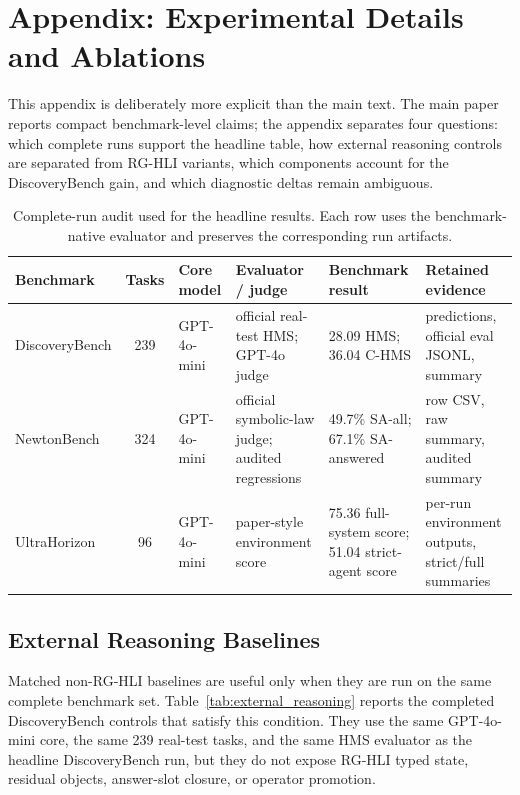 \documentclass[letterpaper]{article}
\newcommand{\tblhdr}{\rowcolor{headerrow}}
\newcommand{\methodshort}{\textsc{RG-HLI}\xspace}
\newcommand{\gptmini}{GPT-4o-mini\xspace}
\newcommand{\gptfour}{GPT-4o\xspace}
\begin{document}


\clearpage
\onecolumn
\section*{Appendix: Experimental Details and Ablations}

This appendix is deliberately more explicit than the main text. The main paper
reports compact benchmark-level claims; the appendix separates four questions:
which complete runs support the headline table, how external reasoning controls
are separated from \methodshort variants, which components account for the
DiscoveryBench gain, and which diagnostic deltas remain ambiguous.

\begin{table}[H]
\centering
\caption{Complete-run audit used for the headline results. Each row uses the
benchmark-native evaluator and preserves the corresponding run artifacts.}
\label{tab:appendix_fullrun_audit}
\small
\setlength{\tabcolsep}{5pt}
\begin{tabularx}{0.96\textwidth}{@{}lclYYY@{}}
\toprule
\tblhdr
Benchmark & Tasks & Core model & Evaluator / judge & Benchmark result & Retained evidence \\
\midrule
DiscoveryBench & 239 & \gptmini & official real-test HMS; \gptfour judge & 28.09 HMS; 36.04 C-HMS & predictions, official eval JSONL, summary \\
NewtonBench & 324 & \gptmini & official symbolic-law judge; audited regressions & 49.7\% SA-all; 67.1\% SA-answered & row CSV, raw summary, audited summary \\
UltraHorizon & 96 & \gptmini & paper-style environment score & 75.36 full-system score; 51.04 strict-agent score & per-run environment outputs, strict/full summaries \\
\bottomrule
\end{tabularx}
\end{table}

\subsection*{External Reasoning Baselines}

Matched non-\methodshort baselines are useful only when they are run on the same
complete benchmark set. Table~\ref{tab:external_reasoning} reports the completed
DiscoveryBench controls that satisfy this condition. They use the same
\gptmini core, the same 239 real-test tasks, and the same HMS evaluator as the
headline DiscoveryBench run, but they do not expose \methodshort typed state,
residual objects, answer-slot closure, or operator promotion.
\end{document}
